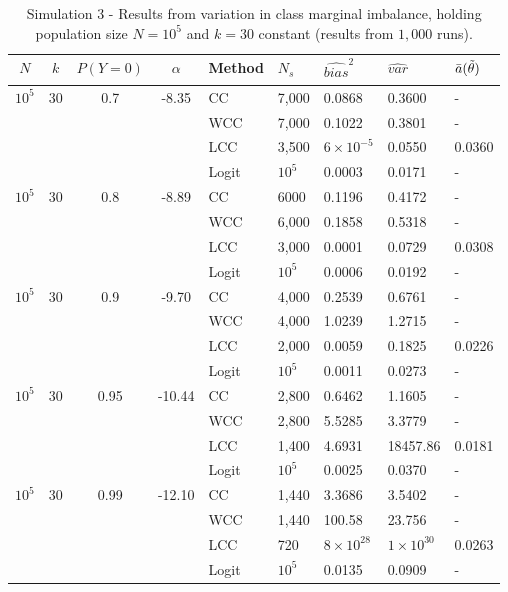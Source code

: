 \begin{table}[ht]
    \centering
    \begin{tabular}{cccclllll}
    \toprule
    $N$ & $k$ & $P(Y=0)$ & $\alpha$ & Method & $N_s$ & $\widehat{bias}^2$ & $\widehat{var}$ & $\Bar{a}(\Tilde{\theta})$\\
    \midrule
    $ 10^5$ & 30 & 0.7 & -8.35 & CC & 7,000 & 0.0868 & 0.3600 & - \\
     & & & & WCC & 7,000 & 0.1022 & 0.3801 & - \\
     & & & & LCC & 3,500 & $6 \times 10^{-5}$ & 0.0550 & 0.0360\\
     & & & & Logit & $10^5$ & 0.0003 & 0.0171 & -\\
     \midrule
     $10^5$ & 30 & 0.8 & -8.89 & CC & 6000  & 0.1196 & 0.4172 & -\\
     & & & & WCC & 6,000 & 0.1858 & 0.5318 & - \\
     & & & & LCC & 3,000 & 0.0001 & 0.0729 & 0.0308 \\
     & & & & Logit & $10^5$ & 0.0006 & 0.0192 & -\\
    \midrule
     $10^5$ & 30 & 0.9 & -9.70 & CC & 4,000 & 0.2539 & 0.6761 & - \\
     & & & & WCC & 4,000 & 1.0239 & 1.2715 & -\\
     & & & & LCC & 2,000 & 0.0059 & 0.1825 & 0.0226 \\
     & & & & Logit & $10^5$ & 0.0011 & 0.0273 & -\\
     \midrule
     $10^5$ & 30 & 0.95 & -10.44 & CC & 2,800 & 0.6462 & 1.1605 & - \\
     & & & & WCC & 2,800 & 5.5285 & 3.3779 & -\\
     & & & & LCC & 1,400 & 4.6931 & 18457.86 & 0.0181 \\
     & & & & Logit & $10^5$ & 0.0025 & 0.0370 & -\\
     \midrule
     $10^5$ & 30 & 0.99 & -12.10 & CC & 1,440 & 3.3686 & 3.5402 & -\\
     & & & & WCC & 1,440 & 100.58 & 23.756 & -\\
     & & & & LCC & 720 & $8 \times 10^{28}$ & $1 \times 10^{30}$ & 0.0263 \\
     & & & & Logit & $10^{5}$ & 0.0135 & 0.0909 & -\\
    \bottomrule
    \end{tabular}
    \caption[Simulation 3 - Increasing marginal imbalance for $N=10^5$ and $k=30$]{Simulation 3 - Results from variation in class marginal imbalance, holding population size $N=10^5$ and $k=30$ constant (results from $1,000$ runs).}
    \label{tab:sim_prob_a}
\end{table}


